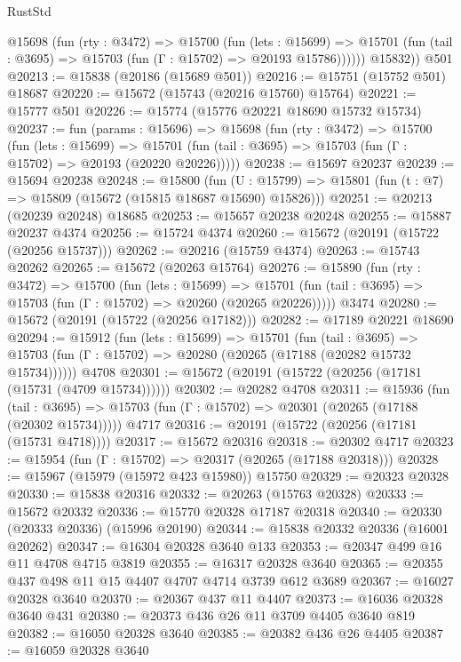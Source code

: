 \begin{lexlean}{RustStd}
\begin{coremodule}
          @15698
            (fun (rty : @3472) =>
            @15700
              (fun (lets : @15699) =>
              @15701 (fun (tail : @3695) => @15703 (fun (Γ : @15702) => @20193 @15786))))))
        @15832))
    @501
@20213 := @15838 (@20186 (@15689 @501))
@20216 := @15751 (@15752 @501) @18687
@20220 := @15672 (@15743 (@20216 @15760) @15764)
@20221 := @15777 @501
@20226 := @15774 (@15776 @20221 @18690 @15732 @15734)
@20237 := fun (params : @15696) =>
  @15698
    (fun (rty : @3472) =>
    @15700
      (fun (lets : @15699) =>
      @15701 (fun (tail : @3695) => @15703 (fun (Γ : @15702) => @20193 (@20220 @20226)))))
@20238 := @15697 @20237
@20239 := @15694 @20238
@20248 := @15800
    (fun (U : @15799) => @15801 (fun (t : @7) => @15809 (@15672 (@15815 @18687 @15690) @15826)))
@20251 := @20213 (@20239 @20248) @18685
@20253 := @15657 @20238 @20248
@20255 := @15887 @20237 @4374
@20256 := @15724 @4374
@20260 := @15672 (@20191 (@15722 (@20256 @15737)))
@20262 := @20216 (@15759 @4374)
@20263 := @15743 @20262
@20265 := @15672 (@20263 @15764)
@20276 := @15890
    (fun (rty : @3472) =>
    @15700
      (fun (lets : @15699) =>
      @15701 (fun (tail : @3695) => @15703 (fun (Γ : @15702) => @20260 (@20265 @20226)))))
    @3474
@20280 := @15672 (@20191 (@15722 (@20256 @17182)))
@20282 := @17189 @20221 @18690
@20294 := @15912
    (fun (lets : @15699) =>
    @15701
      (fun (tail : @3695) =>
      @15703 (fun (Γ : @15702) => @20280 (@20265 (@17188 (@20282 @15732 @15734))))))
    @4708
@20301 := @15672 (@20191 (@15722 (@20256 (@17181 (@15731 (@4709 @15734))))))
@20302 := @20282 @4708
@20311 := @15936
    (fun (tail : @3695) => @15703 (fun (Γ : @15702) => @20301 (@20265 (@17188 (@20302 @15734)))))
    @4717
@20316 := @20191 (@15722 (@20256 (@17181 (@15731 @4718))))
@20317 := @15672 @20316
@20318 := @20302 @4717
@20323 := @15954 (fun (Γ : @15702) => @20317 (@20265 (@17188 @20318)))
@20328 := @15967 (@15979 (@15972 @423 @15980)) @15750
@20329 := @20323 @20328
@20330 := @15838 @20316
@20332 := @20263 (@15763 @20328)
@20333 := @15672 @20332
@20336 := @15770 @20328 @17187 @20318
@20340 := @20330 (@20333 @20336) (@15996 @20190)
@20344 := @15838 @20332 @20336 (@16001 @20262)
@20347 := @16304 @20328 @3640 @133
@20353 := @20347 @499 @16 @11 @4708 @4715 @3819
@20355 := @16317 @20328 @3640
@20365 := @20355 @437 @498 @11 @15 @4407 @4707 @4714 @3739 @612 @3689
@20367 := @16027 @20328 @3640
@20370 := @20367 @437 @11 @4407
@20373 := @16036 @20328 @3640 @431
@20380 := @20373 @436 @26 @11 @3709 @4405 @3640 @819
@20382 := @16050 @20328 @3640
@20385 := @20382 @436 @26 @4405
@20387 := @16059 @20328 @3640

\end{coremodule}
\end{lexlean}
